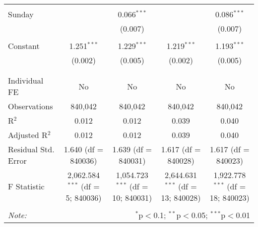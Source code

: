\documentclass[
]{article}
\begin{document}
\begin{table}[!htbp]
{\begin{tabular}{@{\extracolsep{5pt}}lcccc}
  & & & & \\ 
 Sunday &  & 0.066$^{***}$ &  & 0.086$^{***}$ \\ 
  &  & (0.007) &  & (0.007) \\ 
  & & & & \\ 
 Constant & 1.251$^{***}$ & 1.229$^{***}$ & 1.219$^{***}$ & 1.193$^{***}$ \\ 
  & (0.002) & (0.005) & (0.002) & (0.005) \\ 
  & & & & \\ 
\hline \\[-1.8ex] 
Individual FE & No & No & No & No \\ 
Observations & 840,042 & 840,042 & 840,042 & 840,042 \\ 
R$^{2}$ & 0.012 & 0.012 & 0.039 & 0.040 \\ 
Adjusted R$^{2}$ & 0.012 & 0.012 & 0.039 & 0.040 \\ 
Residual Std. Error & 1.640 (df = 840036) & 1.639 (df = 840031) & 1.617 (df = 840028) & 1.617 (df = 840023) \\ 
F Statistic & 2,062.584$^{***}$ (df = 5; 840036) & 1,054.723$^{***}$ (df = 10; 840031) & 2,644.631$^{***}$ (df = 13; 840028) & 1,922.778$^{***}$ (df = 18; 840023) \\ 
\hline 
\hline \\[-1.8ex] 
\textit{Note:}  & \multicolumn{4}{r}{$^{*}$p$<$0.1; $^{**}$p$<$0.05; $^{***}$p$<$0.01} \\ 
\end{tabular}
} 
\end{table} 
\newpage
\end{document}

